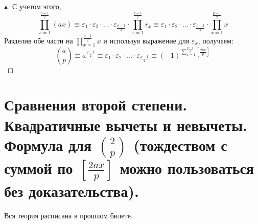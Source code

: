 \begin{theorem}
\begin{proof}[$\blacktriangle$]
        С учетом этого,
        $$
        \prod \limits_{x = 1}^{\frac{p-1}{2}} (ax) \equiv \varepsilon_1 \cdot \varepsilon_2 \cdot ... \cdot \varepsilon_{\frac{p-1}{2}} \cdot \prod \limits_{x = 1}^{\frac{p - 1}{2}} r_x \equiv \varepsilon_1 \cdot \varepsilon_2 \cdot ... \cdot \varepsilon_{\frac{p-1}{2}} \cdot \prod \limits_{x = 1}^{\frac{p - 1}{2}} x
        $$
        Разделив обе части на $\prod \limits_{x = 1}^{\frac{p - 1}{2}} x$ и используя выражение для $\varepsilon_x$, получаем:
        $$
            \binom{a}{p} \equiv a^{\frac{p-1}{2}} \equiv \varepsilon_1 \cdot \varepsilon_2 \cdot ... \cdot \varepsilon_{\frac{p-1}{2}} \equiv (-1)^{\sum \limits_{x = 1}^{\frac{p-1}{2}} \left[ \frac{2ax}{p} \right] }
        $$
    \end{proof}
\end{theorem}


\section{Сравнения второй степени. Квадратичные вычеты и невычеты. Формула для \texorpdfstring{$\binom{2}{p}$}{$C_p^2$} (тождеством с суммой \texorpdfstring{по $\left[ \frac{2ax}{p} \right]$}{} можно пользоваться без доказательства).}

Вся теория расписана в прошлом билете.\\

